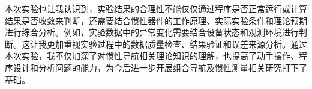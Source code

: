 本次实验也让我认识到，实验结果的合理性不能仅仅通过程序是否正常运行或计算结果是否收敛来判断，还需要结合惯性器件的工作原理、实际实验条件和理论预期进行综合分析。例如，实验数据中的异常变化需要结合设备状态和观测环境进行判断。这让我更加重视实验过程中的数据质量检查、结果验证和误差来源分析。通过本次实验，我不仅加深了对惯性导航相关理论知识的理解，也提高了动手操作、程序设计和分析问题的能力，为今后进一步开展组合导航及惯性测量相关研究打下了基础。



     
